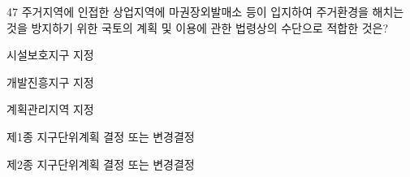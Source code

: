 \begin{question}{47}
주거지역에 인접한 상업지역에 마권장외발매소 등이 입지하여 주거환경을 해치는 것을 방지하기 위한 국토의 계획 및 이용에 관한 법령상의 수단으로 적합한 것은?
\begin{choices}
  \item 시설보호지구 지정
  \item 개발진흥지구 지정
  \item 계획관리지역 지정
  \item 제1종 지구단위계획 결정 또는 변경결정
  \item 제2종 지구단위계획 결정 또는 변경결정
\end{choices}
\end{question}
